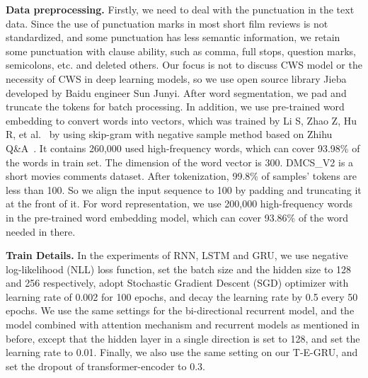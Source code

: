 \textbf{Data preprocessing.}
\label{data-preprocessing-DMCS}
Firstly, we need to deal with the punctuation in the text data. Since the use of punctuation marks in most short film reviews is not standardized, and some punctuation has less semantic information, we retain some punctuation with clause ability, such as comma, full stops, question marks, semicolons, etc. and deleted others. Our focus is not to discuss CWS model or the necessity of CWS in deep learning models, so we use open source library Jieba developed by Baidu engineer Sun Junyi. After word segmentation, we pad and truncate the tokens for batch processing. In addition, we use pre-trained word embedding to convert words into vectors, which was trained by Li S, Zhao Z, Hu R, et al.~\cite{preTrainEmbedding} by using skip-gram with negative sample method based on Zhihu Q\&A~\cite{preTrainEmbedding}. It contains 260,000 used high-frequency words, which can cover 93.98\% of the words in train set. The dimension of the word vector is 300. DMCS\_V2 is a short movies comments dataset. After tokenization, 99.8\% of samples' tokens are less than 100. So we align the input sequence to 100 by padding and truncating it at the front of it. For word representation, we use 200,000 high-frequency words in the pre-trained word embedding model, which can cover 93.86\% of the word needed in there. 

\textbf{Train Details.}
\label{Train-hyper-parameters}
In the experiments of RNN, LSTM and GRU, we use negative log-likelihood (NLL) loss function, set the batch size and the hidden size to 128 and 256 respectively, adopt Stochastic Gradient Descent (SGD) optimizer with learning rate of 0.002 for 100 epochs, and decay the learning rate by 0.5 every 50 epochs.
We use the same settings for the bi-directional recurrent model, and the model combined with attention mechanism and recurrent models as mentioned in before, except that the hidden layer in a single direction is set to 128, and set the learning rate to 0.01. Finally, we also use the same setting on our T-E-GRU, and set the dropout of transformer-encoder to 0.3.

